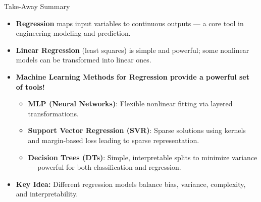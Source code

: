 \documentclass[german,10pt]{beamer}
\begin{document}
\begin{frame}{Take-Away Summary}
\begin{itemize}
  \item \textbf{Regression} maps input variables to continuous outputs — a core tool in engineering modeling and prediction.
  \item \textbf{Linear Regression} (least squares) is simple and powerful; some nonlinear models can be transformed into linear ones.

  \item \textbf{Machine Learning Methods for Regression provide a powerful set of tools!}
  \begin{itemize}
  
    \item \textbf{MLP (Neural Networks)}: Flexible nonlinear fitting via layered transformations.
    \item \textbf{Support Vector Regression (SVR)}: Sparse solutions using kernels and margin-based loss leading to sparse representation.
    \item \textbf{Decision Trees (DTs)}: Simple, interpretable splits to minimize variance — powerful for both classification and regression.
  \end{itemize}
  \item \textbf{Key Idea:} Different regression models balance bias, variance, complexity, and interpretability.
\end{itemize}
\end{frame}

    




\end{document}
